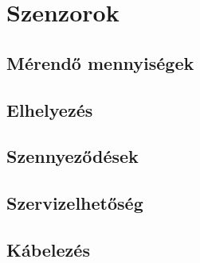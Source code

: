 \chapter{Szenzorok}
\label{sec:Szenzorok}

\section{Mérendő mennyiségek}

\section{Elhelyezés}

\section{Szennyeződések}

\section{Szervizelhetőség}

\section{Kábelezés}
